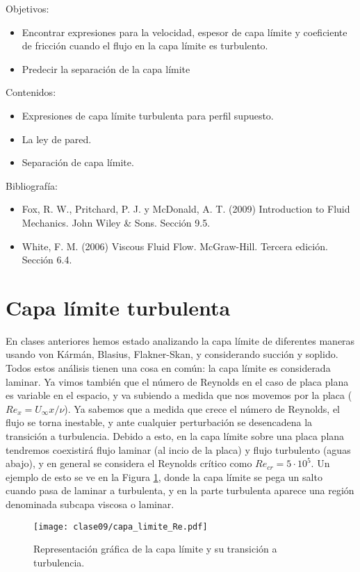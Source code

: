 \begin{framed}

Objetivos:
\begin{itemize}
    \item Encontrar expresiones para la velocidad, espesor de capa límite y coeficiente de fricción cuando el flujo en la capa límite es turbulento. 
    \item Predecir la separación de la capa límite
\end{itemize}

Contenidos:
\begin{itemize}
    \item Expresiones de capa límite turbulenta para perfil supuesto.
    \item La ley de pared. 
    \item Separación de capa límite.
\end{itemize}

Bibliografía:
\begin{itemize}
    \item Fox, R. W., Pritchard, P. J. y McDonald, A. T. (2009) Introduction to Fluid Mechanics. John Wiley \& Sons. Sección 9.5.
    \item White, F. M. (2006) Viscous Fluid Flow. McGraw-Hill. Tercera edición. Sección 6.4.
\end{itemize}
\end{framed}

\section*{Capa límite turbulenta}

En clases anteriores hemos estado analizando la capa límite de diferentes maneras usando von Kármán, Blasius, Flakner-Skan, y considerando succión y soplido.
Todos estos análisis tienen una cosa en común: la capa límite es considerada laminar.
Ya vimos también que el número de Reynolds en el caso de placa plana es variable en el espacio, y va subiendo a medida que nos movemos por la placa ($Re_x=U_\infty x/\nu$).
Ya sabemos que a medida que crece el número de Reynolds, el flujo se torna inestable, y ante cualquier perturbación se desencadena la transición a turbulencia.
Debido a esto, en la capa límite sobre una placa plana tendremos coexistirá flujo laminar (al incio de la placa) y flujo turbulento (aguas abajo), y en general se considera el Reynolds crítico como $Re_{cr} = 5\cdot10^{5}$.
Un ejemplo de esto se ve en la Figura \ref{fig:capa_limite_Re}, donde la capa límite se pega un salto cuando pasa de laminar a turbulenta, y en la parte turbulenta aparece una región denominada subcapa viscosa o laminar.
%
\begin{figure}
\centering
\texttt{[image: clase09/capa\_limite\_Re.pdf]}
\caption{Representación gráfica de la capa límite y su transición a turbulencia.}
\label{fig:capa_limite_Re}
\end{figure}

